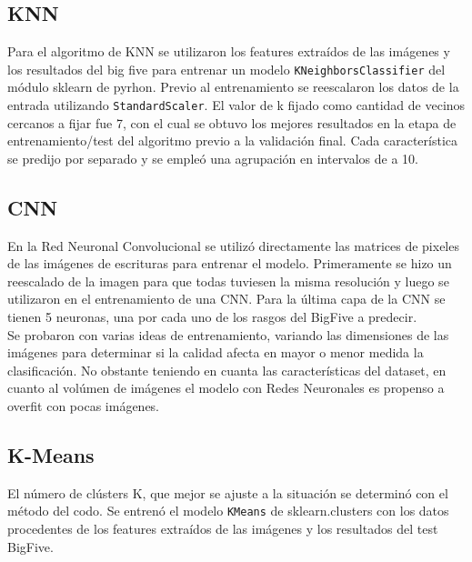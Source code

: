 \documentclass[10pt, a4paper]{article}
\begin{document}
        \subsection{KNN}
            Para el algoritmo de KNN se utilizaron los features extra\'idos de las im\'agenes y los resultados del big five para entrenar un modelo \texttt{KNeighborsClassifier} del m\'odulo sklearn de pyrhon. 
            Previo al entrenamiento se reescalaron los datos de la entrada utilizando \texttt{StandardScaler}. El valor de k fijado como cantidad de vecinos cercanos a fijar fue 7, con el cual se obtuvo los mejores resultados en 
            la etapa de entrenamiento/test del algoritmo previo a la validaci\'on final. Cada caracter\'istica se predijo por separado y se emple\'o una agrupaci\'on en intervalos de a 10.
        
        \subsection{CNN}
            En la Red Neuronal Convolucional se utiliz\'o directamente las matrices de pixeles de las im\'agenes de escrituras para entrenar el modelo. 
            Primeramente se hizo un reescalado de la imagen para que todas tuviesen la misma resoluci\'on y luego se utilizaron en el entrenamiento de una CNN.
            Para la \'ultima capa de la CNN se tienen 5 neuronas, una por cada uno de los rasgos del BigFive a predecir.\\
            
            Se probaron con varias ideas de entrenamiento, variando las dimensiones de las im\'agenes para determinar si la calidad afecta en mayor o menor medida 
            la clasificaci\'on. No obstante teniendo en cuanta las caracter\'isticas del dataset, en cuanto al vol\'umen de im\'agenes el modelo con Redes Neuronales es propenso 
            a overfit con pocas im\'agenes. 

        \subsection{K-Means}
            El n\'umero de cl\'usters K, que mejor se ajuste a la situaci\'on se determin\'o con el m\'etodo del codo. Se entren\'o el 
            modelo \texttt{KMeans} de sklearn.clusters con los datos procedentes de los features extra\'idos de las im\'agenes y los resultados del 
            test BigFive.
        
\end{document}
